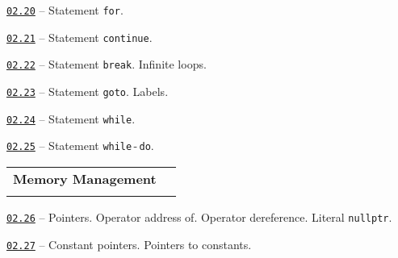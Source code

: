 \documentclass[a4paper,12pt]{article}
\renewenvironment{itemize}
{
    \begin{list}{\labelitemi}
    {
      \setlength{\topsep}{0pt}
      \setlength{\partopsep}{0pt}
      \setlength{\parskip}{0pt}
      \setlength{\itemsep}{0pt}
      \setlength{\parsep}{0pt}
      \setlength{\leftmargin}{14.5pt}
    }
}{\end{list}}
\begin{document}
\begin{itemize}

    \item \href{https://github.com/i-s-m-mipt/Education/blob/master/projects/examples/source/02.20.cpp}{\texttt{02.20}} -- Statement \lstinline{for}.

    \smallskip

    \item \href{https://github.com/i-s-m-mipt/Education/blob/master/projects/examples/source/02.21.cpp}{\texttt{02.21}} -- Statement \lstinline{continue}.

    \smallskip

    \item \href{https://github.com/i-s-m-mipt/Education/blob/master/projects/examples/source/02.22.cpp}{\texttt{02.22}} -- Statement \lstinline{break}. Infinite loops.

    \smallskip

    \item \href{https://github.com/i-s-m-mipt/Education/blob/master/projects/examples/source/02.23.cpp}{\texttt{02.23}} -- Statement \lstinline{goto}. Labels.

    \smallskip

    \item \href{https://github.com/i-s-m-mipt/Education/blob/master/projects/examples/source/02.24.cpp}{\texttt{02.24}} -- Statement \lstinline{while}.

    \smallskip

    \item \href{https://github.com/i-s-m-mipt/Education/blob/master/projects/examples/source/02.25.cpp}{\texttt{02.25}} -- Statement \lstinline{while}\,-\,\lstinline{do}.

\end{itemize}

\bigskip\medskip

\begin{tabular}{!{\vrule width 1pt}L{4.4cm}!{\vrule width 1pt}L{14.6cm}!{\vrule width 0pt}} 


\textbf{Memory Management} & \\


\end{tabular}

\medskip\smallskip

\begin{itemize}

    \item \href{https://github.com/i-s-m-mipt/Education/blob/master/projects/examples/source/02.26.cpp}{\texttt{02.26}} -- Pointers. Operator address of. Operator dereference. Literal \lstinline{nullptr}.

    \smallskip

    \item \href{https://github.com/i-s-m-mipt/Education/blob/master/projects/examples/source/02.27.cpp}{\texttt{02.27}} -- Constant pointers. Pointers to constants.

\end{itemize}
\end{document}
